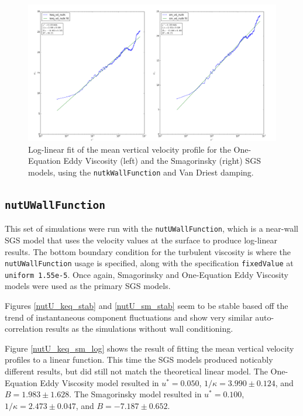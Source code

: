 \documentclass[12pt]{article}
\begin{document}
\begin{figure}[H]
\centering
\includegraphics[scale=0.35]{vd_nutk/keq_sm_log.png}
\caption{Log-linear fit of the mean vertical velocity profile for the One-Equation Eddy Viscosity (left) and the Smagorinsky (right) SGS models, using the \texttt{nutkWallFunction} and Van Driest damping.}
\label{vd_nutk_keq_sm_log}
\end{figure}

\subsection{\texttt{nutUWallFunction}}
This set of simulations were run with the \texttt{nutUWallFunction}, which is a near-wall SGS model that uses the velocity values at the surface to produce log-linear results.  The bottom boundary condition for the turbulent viscosity is where the \texttt{nutUWallFunction} usage is specified, along with the specification \texttt{fixedValue} at \texttt{uniform 1.55e-5}.  Once again, Smagorinsky and One-Equation Eddy Viscosity models were used as the primary SGS models.

Figures \ref{nutU_keq_stab} and \ref{nutU_sm_stab} seem to be stable based off the trend of instantaneous component fluctuations and show very similar auto-correlation results as the simulations without wall conditioning. 

Figure \ref{nutU_keq_sm_log} shows the result of fitting the mean vertical velocity profiles to a linear function.  This time the SGS models produced noticably different results, but did still not match the theoretical linear model.  The One-Equation Eddy Viscosity model resulted in $u^* = 0.050$, $1/\kappa = 3.990 \pm 0.124$, and $B = 1.983 \pm 1.628$.  The Smagorinsky model resulted in $u^* = 0.100$, $1/\kappa = 2.473 \pm 0.047$, and $B = -7.187 \pm 0.652$.
\end{document}
